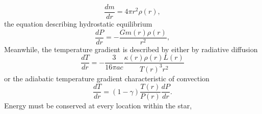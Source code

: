 \begin{equation}
    \frac{dm}{dr} = 4\pi r^2 \rho(r),
\end{equation}
the equation describing hydrostatic equilibrium
\begin{equation}
    \frac{dP}{dr} = -\frac{G m(r)\rho(r)}{r^2},
\end{equation}
Meanwhile, the temperature gradient is described by either by radiative diffusion
\begin{equation}
    \frac{dT}{dr} = -\frac{3}{16\pi ac}\frac{\kappa(r) \rho(r) L(r)}{T(r)^3 r^2}
\end{equation}
or the adiabatic temperature gradient characteristic of convection
\begin{equation}
    \frac{dT}{dr} = (1 - \gamma)\frac{T(r)}{P(r)}\frac{dP}{dr}.
\end{equation}
Energy must be conserved at every location within the star,
\begin{equation}
\end{equation}